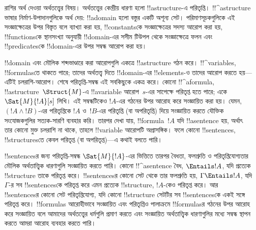\documentclass[../../../include/open-logic-section]{subfiles}
\begin{document}


রাশির অর্থ দেওয়া অর্থতত্ত্বের বিষয়। অর্থতত্ত্বের কেন্দ্রীয় ধারণা হলো
!!a{structure}-এ পরিতৃপ্তি। !!^a{structure} ভাষার নির্মাণ-উপাদানগুলিকে
অর্থ দেয়: !!a{domain} হলো বস্তুর একটি অশূন্য সেট। পরিমাণসূচকগুলিকে
এই সংজ্ঞাক্ষেত্রের উপর বিস্তৃত বলে ব্যাখ্যা করা হয়, !!{constant}sকে
সংজ্ঞাক্ষেত্রের সদস্য আরোপ করা হয়, !!{function}sকে স্থানসংখ্যা
অনুযায়ী !!{domain}-এর সসীম টিউপল থেকে সংজ্ঞাক্ষেত্রে ফলন এবং
!!{predicate}sকে !!{domain}-এর উপর সম্বন্ধ আরোপ করা হয়।

!!{domain} এবং মৌলিক শব্দভাণ্ডারে করা আরোপগুলি একত্রে
!!a{structure} গঠন করে। !!^{variable}s, !!{formula}sতে থাকতে পারে; তাদের
অর্থতত্ত্ব দিতে !!{domain}-এর !!{element}s-ও তাদের আরোপ করতে হয়—এটিই
চলরাশি-আরোপ। শেষে পরিতৃপ্তি-সম্বন্ধ এই সবকিছুকে একত্র করে। কোনো
!!^a{formula}, !!a{structure}~$\Struct{M}$-এ !!a{variable} আরোপ~$s$-এর
সাপেক্ষে পরিতৃপ্ত হতে পারে; একে $\Sat{M}{!A}[s]$ লিখি। এই সম্বন্ধটিকেও
$!A$-এর গঠনের উপর আরোহ করে সংজ্ঞায়িত করা হয়। যেমন, $(!A \land !B)$-এর
পরিতৃপ্তিকে $!A$ ও~$!B$-এর পরিতৃপ্তি (বা অপরিতৃপ্তি) দিয়ে সংজ্ঞায়িত
করতে যৌক্তিক সংযোজকগুলির সত্যক-সারণি ব্যবহার করি। তারপর দেখা যায়,
!!{formula}~$!A$ যদি !!a{sentence} হয়, অর্থাৎ তার কোনো মুক্ত চলরাশি
না থাকে, তাহলে !!{variable} আরোপটি অপ্রাসঙ্গিক। ফলে কোনো
!!{sentence}s, !!{structure}sতে কেবল পরিতৃপ্ত (বা অপরিতৃপ্ত)—এ কথাই
বলতে পারি।

!!{sentence}sর জন্য পরিতৃপ্তি-সম্বন্ধ $\Sat{M}{!A}$-এর ভিত্তিতে
তারপর বৈধতা, ফলশ্রুতি ও পরিতৃপ্তিযোগ্যতার মৌলিক অর্থতাত্ত্বিক ধারণাগুলি
সংজ্ঞায়িত করতে পারি। কোনো !!^a{sentence} বৈধ, $\Entails !A$, যদি
প্রত্যেক !!{structure} তাকে পরিতৃপ্ত করে। !!{sentence}sর কোনো সেট থেকে
তার ফলশ্রুতি হয়, $\Gamma \Entails !A$, যদি $\Gamma$-র
সব !!{sentence}sকে পরিতৃপ্ত করে এমন প্রত্যেক !!{structure}, $!A$-কেও
পরিতৃপ্ত করে। আর !!{sentence}sর কোনো সেট পরিতৃপ্তিযোগ্য, যদি কোনো
!!{structure} সেটটির সব !!{sentence}sকে একই সঙ্গে পরিতৃপ্ত করে।
!!{formula}s আরোহীভাবে সংজ্ঞায়িত এবং পরিতৃপ্তিও পালাক্রমে
!!{formula}sর গঠনের উপর আরোহ করে সংজ্ঞায়িত বলে আমাদের অর্থতত্ত্বের
ধর্মগুলি প্রমাণ করতে এবং সংজ্ঞায়িত অর্থতাত্ত্বিক ধারণাগুলির মধ্যে
সম্বন্ধ স্থাপন করতে আমরা আরোহ ব্যবহার করতে পারি।
\end{document}
